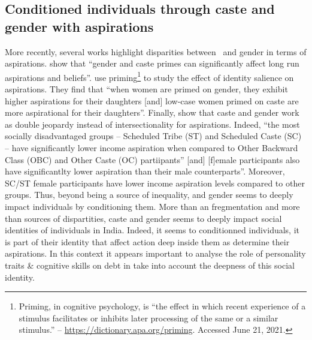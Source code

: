 \documentclass[a4paper, 11pt, onecolumn]{article}
\begin{document}
\subsection{Conditioned individuals through caste and gender with aspirations}
More recently, several works highlight disparities between \jati ~and gender in terms of aspirations.
\cite{Mukherjee2017} show that ``gender and caste primes can significantly affect long run aspirations and beliefs''. 
\cite{Alvi2019} use priming\footnote{Priming, in cognitive psychology, is ``the effect in which recent experience of a stimulus facilitates or inhibits later processing of the same or a similar stimulus.'' -- \url{https://dictionary.apa.org/priming}. Accessed June 21, 2021.} to study the effect of identity salience on aspirations.
They find that ``when women are primed on gender, they exhibit higher aspirations for their daughters [and] low-case  women primed on caste are more aspirational for their daughters''.
Finally, \cite{Sarkar2020} show that caste and gender work as double jeopardy instead of intersectionality for aspirations.
Indeed, ``the most socially disadvantaged groups -- Scheduled Tribe (ST) and Scheduled Caste (SC) -- have significantly lower income aspiration when compared to Other Backward Class (OBC) and Other Caste (OC) partiipants'' [and] [f]emale participants also have significantlty lower aspiration than their male counterparts''.
Moreover, SC/ST female participants have lower income aspiration levels compared to other groups.
Thus, beyond being a source of inequality, \jati and gender seems to deeply impact individuals by conditioning them.
More than an fregmentation and more than sources of dispartities, caste and gender seems to deeply impact social identities of individuals in India.
Indeed, it seems to conditionned individuals, it is part of their identity that affect action deep inside them as determine their aspirations.
In this context it appears important to analyse the role of personality traits \& cognitive skills on debt in take into account the deepness of this social identity.
\end{document}
